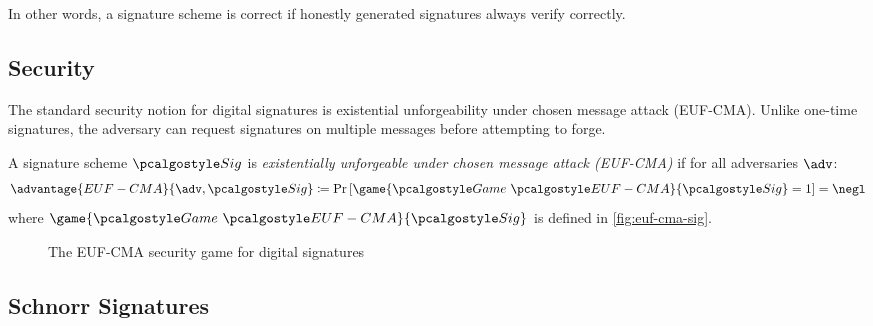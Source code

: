 In other words, a signature scheme is correct if honestly generated signatures always verify correctly.

\subsection{Security}

The standard security notion for digital signatures is existential unforgeability under chosen message attack (EUF-CMA). Unlike one-time signatures, the adversary can request signatures on multiple messages before attempting to forge.

\begin{definition}\label{def:euf-cma}
  A signature scheme $\algo{Sig}$ is \emph{existentially unforgeable under chosen message attack (EUF-CMA)} if for all \ppt adversaries $\adv$:
  \[
    \advantage{EUF-CMA}{\adv, \algo{Sig}} \defeq \pr{\game{\Game~\algo{EUF-CMA}}{\algo{Sig}} = 1} = \negl
  \]
  where $\game{\Game~\algo{EUF-CMA}}{\algo{Sig}}$ is defined in \autoref{fig:euf-cma-sig}.
\end{definition}

\begin{figure}[tbh]
  \begin{tcolorbox}
    \begin{pchstack}[center]
      \pchspace
    \end{pchstack}
  \end{tcolorbox}
  \caption{The EUF-CMA security game for digital signatures}
  \label{fig:euf-cma-sig}
\end{figure}

\subsection{Schnorr Signatures}


